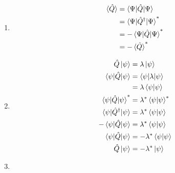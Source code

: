 \documentclass{article}
\begin{document}
\begin{enumerate}
  \item

        \begin{align*}
          \braket{\hat{Q}} & = \braket{\Psi | \hat{Q} | \Psi}           \\
                           & = \braket{\Psi | \hat{Q}^\dagger | \Psi}^* \\
                           & = -\braket{\Psi | \hat{Q} | \Psi}^*        \\
                           & = -\braket{\hat{Q}}^*
        \end{align*}

  \item

        \begin{align*}
          \hat{Q} \ket{\psi}                     & = \lambda \ket{\psi}               \\
          \braket{\psi | \hat{Q} | \psi}         & = \braket{\psi | \lambda | \psi}   \\
                                                 & = \lambda \braket{\psi | \psi}     \\
          \braket{\psi | \hat{Q} | \psi}^*       & = \lambda^* \braket{\psi | \psi}^* \\
          \braket{\psi | \hat{Q}^\dagger | \psi} & = \lambda^* \braket{\psi | \psi}   \\
          -\braket{\psi | \hat{Q} | \psi}        & = \lambda^* \braket{\psi | \psi}   \\
          \braket{\psi | \hat{Q} | \psi}         & = -\lambda^* \braket{\psi | \psi}  \\
          \hat{Q} \ket{\psi}                     & = -\lambda^* \ket{\psi}
        \end{align*}

  \item


\end{enumerate}
\end{document}
